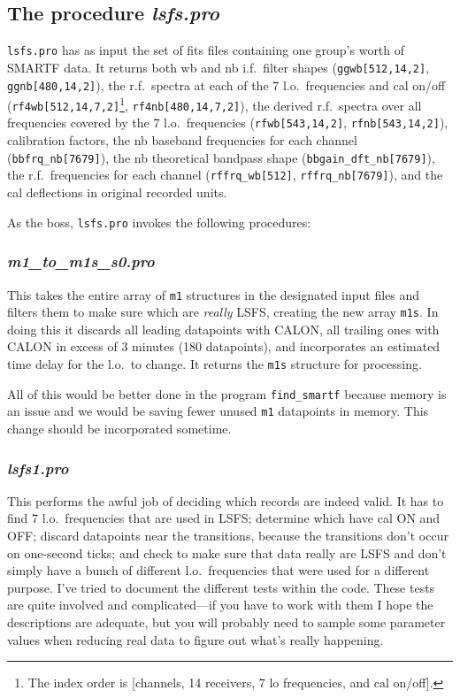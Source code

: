 \documentclass[psfig,preprint]{aastex}
\begin{document}
\subsection{The procedure \it lsfs.pro}

	\verb$lsfs.pro$ has as input the set of fits files containing one
group's worth of SMARTF data.  It returns both wb and nb i.f.\ filter
shapes (\verb$ggwb[512,14,2]$, \verb$ggnb[480,14,2]$), the r.f.\ spectra
at each of the 7 l.o.\ frequencies and cal on/off
(\verb$rf4wb[512,14,7,2]$\footnote{The index order is [channels, 14
receivers, 7 lo frequencies, and cal on/off].},
\verb$rf4nb[480,14,7,2]$), the derived r.f.\ spectra over all frequencies
covered by the 7 l.o.\ frequencies (\verb$rfwb[543,14,2]$,
\verb$rfnb[543,14,2]$), calibration factors, the nb baseband frequencies
for each channel (\verb$bbfrq_nb[7679]$), the nb theoretical bandpass
shape (\verb$bbgain_dft_nb[7679]$), the r.f.\ frequencies for each
channel (\verb$rffrq_wb[512]$, \verb$rffrq_nb[7679]$), and the cal
deflections in original recorded units. 

	As the boss, \verb$lsfs.pro$ invokes the following procedures:

\subsubsection{ \it m1\_to\_m1s\_s0.pro} 

	This takes the entire array of \verb$m1$ structures in the
designated input files and filters them to make sure which are {\it
really} LSFS, creating the new array \verb$m1s$. In doing this it
discards all leading datapoints with CALON, all trailing ones with CALON
in excess of 3 minutes (180 datapoints), and incorporates an estimated
time delay for the l.o.\ to change. It returns the \verb$m1s$ structure
for processing.

	All of this would be better done in the program
\verb$find_smartf$ because memory is an issue and we would be saving
fewer unused \verb$m1$ datapoints in memory. This change should be
incorporated sometime. 

\subsubsection{ \it lsfs1.pro} 

	This performs the awful job of deciding which records are indeed
valid. It has to find 7 l.o.\ frequencies that are used in LSFS;
determine which have cal ON and OFF; discard datapoints near the
transitions, because the transitions don't occur on one-second ticks;
and check to make sure that data really are LSFS and don't simply have a
bunch of different l.o.\ frequencies that were used for a different
purpose. I've tried to document the different tests within the code. 
These tests are quite involved and complicated---if you have to work
with them I hope the descriptions are adequate, but you will probably
need to sample some parameter values when reducing real data to figure
out what's really happening.
\end{document}
